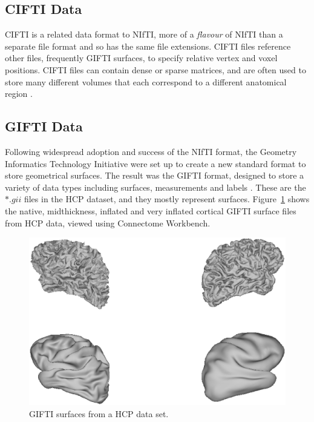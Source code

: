 \documentclass[MSc,paper=a4,pagesize=auto]{icldt}
\begin{document}
\subsection{CIFTI Data}
CIFTI is a related data format to NIfTI, more of a \textit{flavour} of NIfTI than a separate file format and so has the same file extensions. CIFTI files reference other files, frequently GIFTI surfaces, to specify relative vertex and voxel positions. CIFTI files can contain dense or sparse matrices, and are often used to store many different volumes that each correspond to a different anatomical region \cite{WorkbenchGlossary2014}. 

\subsection{GIFTI Data}
Following widespread adoption and success of the NIfTI format, the Geometry Informatics Technology Initiative were set up to create a new standard format to store geometrical surfaces. The result was the GIFTI format, designed to store a variety of data types including surfaces, measurements and labels \cite{Harwell2011}. These are the $\ast.gii$ files in the HCP dataset, and they mostly represent surfaces. Figure~\ref{fig:connectome_gifti} shows the native, midthickness, inflated and very inflated cortical GIFTI surface files from HCP data, viewed using Connectome Workbench.

\begin{figure}[htbp!]
    \centering
    \includegraphics[width=\textwidth]{resources/connectome_gifti}
    \caption{GIFTI surfaces from a HCP data set.}
    \label{fig:connectome_gifti}
\end{figure}
\end{document}
